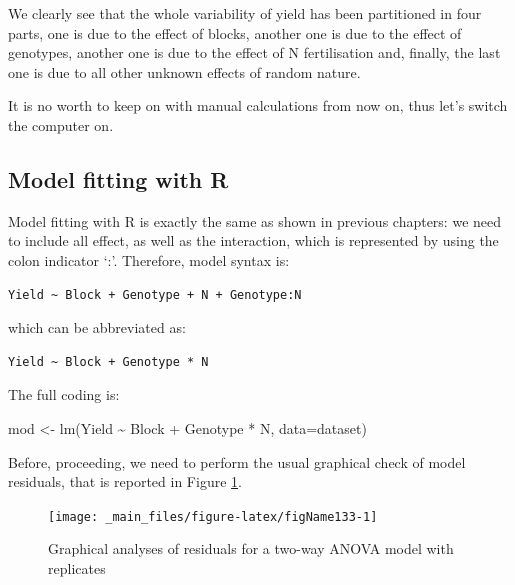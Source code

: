 \documentclass[a4paper,12pt,oneside]{book}
\newenvironment{Shaded}{\begin{snugshade}}{\end{snugshade}}
\newcommand{\SpecialCharTok}[1]{#1}
\newcommand{\OtherTok}[1]{#1}
\newcommand{\FunctionTok}[1]{#1}
\newcommand{\AttributeTok}[1]{#1}
\newcommand{\NormalTok}[1]{#1}
\begin{document}
We clearly see that the whole variability of yield has been partitioned in four parts, one is due to the effect of blocks, another one is due to the effect of genotypes, another one is due to the effect of N fertilisation and, finally, the last one is due to all other unknown effects of random nature.

It is no worth to keep on with manual calculations from now on, thus let's switch the computer on.

\hypertarget{model-fitting-with-r-1}{%
\subsection{Model fitting with R}\label{model-fitting-with-r-1}}

Model fitting with R is exactly the same as shown in previous chapters: we need to include all effect, as well as the interaction, which is represented by using the colon indicator `:'. Therefore, model syntax is:

\vspace{12pt}

\begin{verbatim}
Yield ~ Block + Genotype + N + Genotype:N
\end{verbatim}

which can be abbreviated as:

\vspace{12pt}

\begin{verbatim}
Yield ~ Block + Genotype * N
\end{verbatim}

The full coding is:

\vspace{12pt}

\begin{Shaded}
\begin{Highlighting}[]
\NormalTok{mod }\OtherTok{\textless{}{-}} \FunctionTok{lm}\NormalTok{(Yield }\SpecialCharTok{\textasciitilde{}}\NormalTok{ Block }\SpecialCharTok{+}\NormalTok{ Genotype }\SpecialCharTok{*}\NormalTok{ N, }\AttributeTok{data=}\NormalTok{dataset)}
\end{Highlighting}
\end{Shaded}

Before, proceeding, we need to perform the usual graphical check of model residuals, that is reported in Figure \ref{fig:figName133}.

\vspace{12pt}
\begin{figure}

{\centering \texttt{[image: \_main\_files/figure-latex/figName133-1]} 

}

\caption{Graphical analyses of residuals for a two-way ANOVA model with replicates}\label{fig:figName133}
\end{figure}
\end{document}
